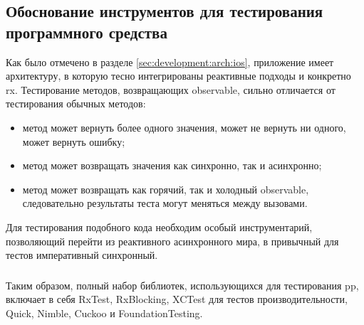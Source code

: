 \subsection{Обоснование инструментов для тестирования программного средства}
\label{sec:testing:tech}

Как было отмечено в разделе \ref{sec:development:arch:ios}, приложение имеет архитектуру, в которую тесно интегрированы реактивные подходы и конкретно \gls{rx}. Тестирование методов, возвращающих \gls{observable}, сильно отличается от тестирования обычных методов:

\begin{itemize}
	\item метод может вернуть более одного значения, может не вернуть ни одного, может вернуть ошибку;
	\item метод может возвращать значения как синхронно, так и асинхронно;
	\item метод может возвращать как горячий, так и холодный \gls{observable}, следовательно результаты теста могут меняться между вызовами.
\end{itemize}

Для тестирования подобного кода необходим особый инструментарий, позволяющий перейти из реактивного асинхронного мира, в привычный для тестов императивный синхронный.




\subsubsection{}
\label{sec:testing:tech:result}
Таким образом, полный набор библиотек, использующихся для тестирования \gls{pp}, включает в себя RxTest, RxBlocking, XCTest для тестов производительности, Quick, Nimble, Cuckoo и FoundationTesting.
